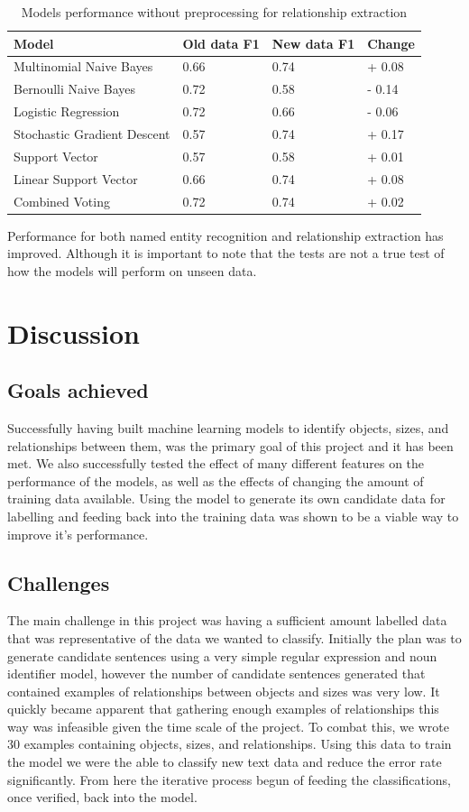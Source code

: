 \documentclass[11pt,oneside]{book}
\begin{document}
\begin{longtable}[c]{|l|l|l|l|}
\caption{Models performance without preprocessing for relationship extraction}
\label{tab:new_re_feature_set_1}\\
\hline
\textbf{Model} & \textbf{Old data F1} & \textbf{New data F1} & \textbf{Change} \\ \hline
\endfirsthead
%
\endhead
%
Multinomial Naive Bayes & 0.66 & 0.74 & + 0.08 \\ \hline
Bernoulli Naive Bayes & 0.72 & 0.58 & - 0.14 \\ \hline
Logistic Regression & 0.72 & 0.66 & - 0.06 \\ \hline
Stochastic Gradient Descent & 0.57 & 0.74 & + 0.17 \\ \hline
Support Vector & 0.57 & 0.58 & + 0.01 \\ \hline
Linear Support Vector & 0.66 & 0.74 & + 0.08 \\ \hline
Combined Voting & 0.72 & 0.74 & + 0.02 \\ \hline
\end{longtable}

Performance for both named entity recognition and relationship extraction has improved. Although it is important to note that the tests are not a true test of how the models will perform on unseen data.

\chapter{Discussion}

\section{Goals achieved}
Successfully having built machine learning models to identify objects, sizes, and relationships between them, was the primary goal of this project and it has been met. We also successfully tested the effect of many different features on the performance of the models, as well as the effects of changing the amount of training data available. Using the model to generate its own candidate data for labelling and feeding back into the training data was shown to be a viable way to improve it's performance.

\section{Challenges}
The main challenge in this project was having a sufficient amount labelled data that was representative of the data we wanted to classify. Initially the plan was to generate candidate sentences using a very simple regular expression and noun identifier model, however the number of candidate sentences generated that contained examples of relationships between objects and sizes was very low. It quickly became apparent that gathering enough examples of relationships this way was infeasible given the time scale of the project. To combat this, we wrote 30 examples containing objects, sizes, and relationships. Using this data to train the model we were the able to classify new text data and reduce the error rate significantly. From here the iterative process begun of feeding the classifications, once verified, back into the model.
\end{document}
